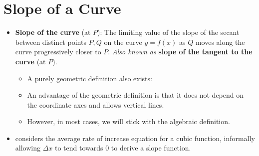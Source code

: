 \documentclass[../main.tex]{subfiles}
\begin{document}
\section{Slope of a Curve}
\begin{itemize}
    \item \textbf{Slope of the curve} (at $P$): The limiting value of the slope of the secant between distinct points $P,Q$ on the curve $y=f(x)$ as $Q$ moves along the curve progressively closer to $P$. \emph{Also known as} \textbf{slope of the tangent to the curve} (at $P$).
    \begin{itemize}
        \item A purely geometric definition also exists: 
        \item An advantage of the geometric definition is that it does not depend on the coordinate axes and allows vertical lines.
        \item However, in most cases, we will stick with the algebraic definition.
    \end{itemize}
    \item \textcite{bib:Thomas} considers the average rate of increase equation for a cubic function, informally allowing $\Delta x$ to tend towards 0 to derive a slope function.
\end{itemize}
\end{document}
